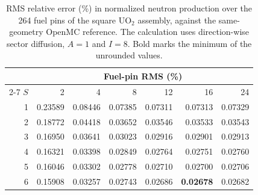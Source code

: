 \begin{table}[htbp]
\centering
\caption{RMS relative error (\%) in normalized neutron production over the 264 fuel pins of the square UO$_2$ assembly, against the same-geometry OpenMC reference. The calculation uses direction-wise sector diffusion, $A=1$ and $I=8$. Bold marks the minimum of the unrounded values.}
\label{tab:study4-square-uo2-pin-rms}
\begin{tabular}{rrrrrrr}
\hline
 & \multicolumn{6}{c}{Fuel-pin RMS (\%)}\\
\cline{2-7}
$S$ & 2 & 4 & 8 & 12 & 16 & 24\\
\hline
1 & 0.23589 & 0.08446 & 0.07385 & 0.07311 & 0.07313 & 0.07329 \\
2 & 0.18772 & 0.04418 & 0.03652 & 0.03546 & 0.03533 & 0.03543 \\
3 & 0.16950 & 0.03641 & 0.03023 & 0.02916 & 0.02901 & 0.02913 \\
4 & 0.16321 & 0.03398 & 0.02849 & 0.02764 & 0.02751 & 0.02760 \\
5 & 0.16046 & 0.03302 & 0.02778 & 0.02710 & 0.02700 & 0.02706 \\
6 & 0.15908 & 0.03257 & 0.02743 & 0.02686 & \textbf{0.02678} & 0.02682 \\
\hline
\end{tabular}
\end{table}

